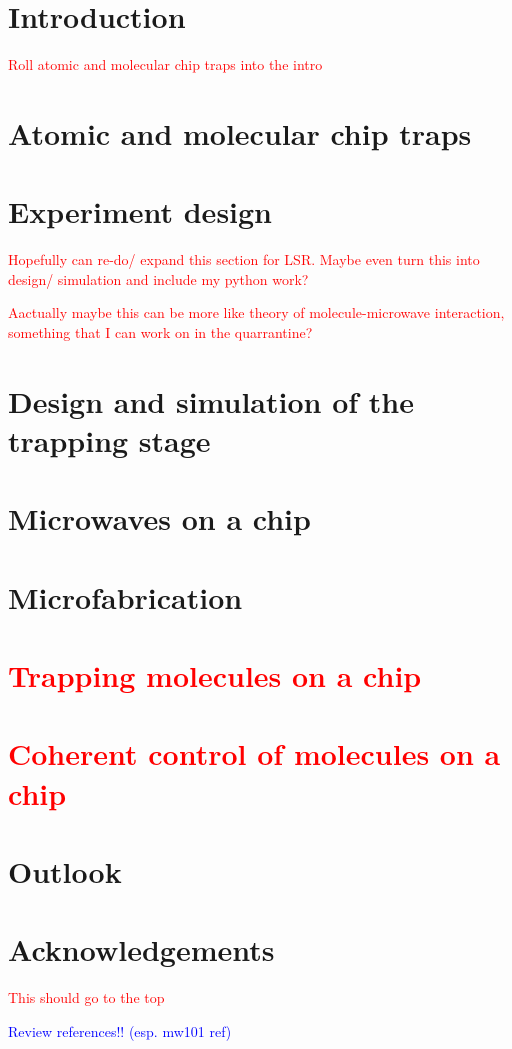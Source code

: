 \documentclass[a4paper, 12pt, twoside]{report}
\newcommand{\cm}[1]{\textcolor{blue}{#1}} %
\newcommand{\thesis}[1]{\textcolor{red}{#1}} %
\begin{document}
\chapter{Introduction}
\thesis{Roll atomic and molecular chip traps into the intro}



\chapter{Atomic and molecular chip traps}
\label{chiptraps}


\chapter{Experiment design}
\label{experiment}

\thesis{Hopefully can re-do/ expand this section for LSR. Maybe even turn this
into design/ simulation and include my python work?}

\thesis{Aactually maybe this can be more like theory of molecule-microwave
interaction, something that I can work on in the quarrantine?}



\chapter{Design and simulation of the trapping stage}
\label{design}


\chapter{Microwaves on a chip}


\chapter{Microfabrication}
\label{fab}


\thesis{
\chapter{Trapping molecules on a chip}
\chapter{Coherent control of molecules on a chip}
}

\chapter{Outlook}
\label{outlook}


\clearpage

\chapter*{Acknowledgements}
\thesis{This should go to the top}


\cm{Review references!! (esp. mw101 ref)}


\end{document}
